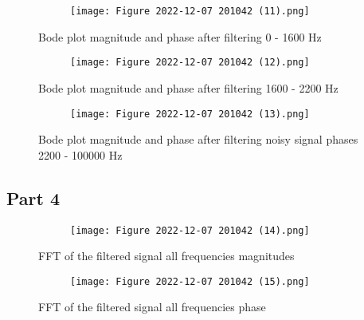 \documentclass[12pt,a4paper]{article}
\begin{document}
\begin{figure}[h]
\centering
\begin{subfigure}{ 1\textwidth}
\texttt{[image: Figure 2022-12-07 201042 (11).png]}
\end{subfigure}
\caption{ Bode plot  magnitude and phase after filtering  0 - 1600 Hz  }
\label{fig2:image22}
\end{figure}

\begin{figure}[h]
\centering
\begin{subfigure}{ 1\textwidth}
\texttt{[image: Figure 2022-12-07 201042 (12).png]}
\end{subfigure}
\caption{ Bode plot magnitude and phase after filtering 1600 - 2200 Hz  }
\label{fig2:image22}
\end{figure}

\begin{figure}[h]
\centering
\begin{subfigure}{ 1\textwidth}
\texttt{[image: Figure 2022-12-07 201042 (13).png]}
\end{subfigure}
\caption{ Bode plot  magnitude and phase after filtering noisy signal phases 2200 - 100000 Hz  }
\label{fig2:image22}
\end{figure}

\clearpage

\subsection{Part 4}



\begin{figure}[h]
\centering
\begin{subfigure}{ 1\textwidth}
\texttt{[image: Figure 2022-12-07 201042 (14).png]}
\end{subfigure}
\caption{ FFT of the filtered signal all frequencies magnitudes }
\label{fig2:image22}
\end{figure}


\begin{figure}[h]
\centering
\begin{subfigure}{ 1\textwidth}
\texttt{[image: Figure 2022-12-07 201042 (15).png]}
\end{subfigure}
\caption{ FFT of the filtered signal all frequencies phase }
\label{fig2:image22}
\end{figure}
\end{document}
